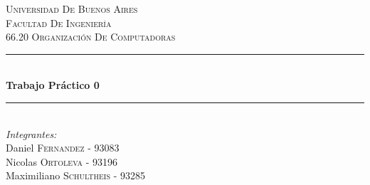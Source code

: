 \documentclass{article}
\begin{document}
 
\begin{titlepage}

\newcommand{\HRule}{\rule{\linewidth}{0.5mm}} %

\center %
 

\textsc{\LARGE Universidad De Buenos Aires}\\[1.5cm] %
\textsc{\Large Facultad De Ingeniería}\\[0.5cm] %
\textsc{\large 66.20 Organización De Computadoras}\\[0.5cm] %


\HRule \\[0.4cm]
{ \huge \bfseries Trabajo Práctico 0}\\[0.4cm] %
\HRule \\[1.5cm]
 

\Large \emph{Integrantes:}\\
Daniel \textsc{Fernandez} - 93083\\ %
Nicolas \textsc{Ortoleva} - 93196\\ %
Maximiliano \textsc{Schultheis} - 93285\\[5cm] %



\end{titlepage}
\end{document}
